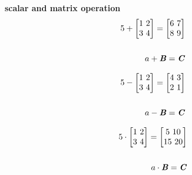 \documentclass[12pt]{minimal}
\begin{document}
 

\textbf{scalar and matrix operation} \\ 

\begin{equation}
    \begin{split}
        5 +
        \begin{bmatrix}
            1\ 2\\
            3\ 4\\
        \end{bmatrix} = 
        \begin{bmatrix}
            6\ 7\\
            8\ 9\\
        \end{bmatrix} \\ \\ 
        a + \textbf{\textit{B}} = \textbf{\textit{C}} 
    \end{split}
\end{equation}


\begin{equation}
    \begin{split}
        5 -
        \begin{bmatrix}
            1\ 2\\
            3\ 4\\
        \end{bmatrix} = 
        \begin{bmatrix}
            4\ 3\\
            2\ 1\\
        \end{bmatrix} \\ \\
        a - \textbf{\textit{B}} = \textbf{\textit{C}}
    \end{split}
\end{equation}



\begin{equation}
    \begin{split}
        5 \cdot
        \begin{bmatrix}
            1\ 2\\
            3\ 4\\
        \end{bmatrix} = 
        \begin{bmatrix}
            5\ 10\\
            15\ 20\\
        \end{bmatrix} \\ \\
        a \cdot \textbf{\textit{B}} = \textbf{\textit{C}}
    \end{split}
\end{equation}
\end{document}
